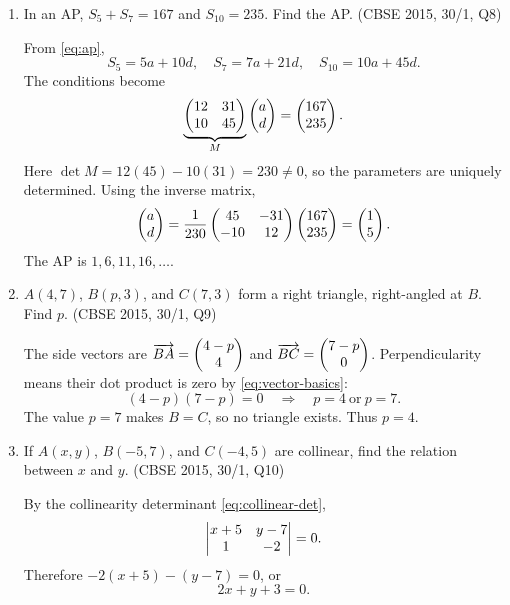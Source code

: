 \begin{enumerate}[label=\textbf{Q\arabic*.},ref=\arabic*,start=5]
\solution Rearranging and using \eqref{eq:difference-squares},
\[
(2x+b)^2-a^2=0\quad\Longrightarrow\quad (2x+b-a)(2x+b+a)=0.
\]
Thus $2x+b=\pm a$, giving
\[
\boxed{x=\frac{-b+a}{2}\quad\text{or}\quad x=\frac{-b-a}{2}}.
\]

\item In an AP, $S_5+S_7=167$ and $S_{10}=235$. Find the AP. \hfill (CBSE 2015, 30/1, Q8)

\solution From \eqref{eq:ap},
\[
S_5=5a+10d,\quad S_7=7a+21d,\quad S_{10}=10a+45d.
\]
The conditions become
\[
\underbrace{\begin{pmatrix}12&31\\10&45\end{pmatrix}}_{M}\begin{pmatrix}a\\d\end{pmatrix}=\begin{pmatrix}167\\235\end{pmatrix}.
\]
Here $\det M=12(45)-10(31)=230\ne0$, so the parameters are uniquely determined. Using the inverse matrix,
\[
\begin{pmatrix}a\\d\end{pmatrix}=\frac1{230}\begin{pmatrix}45&-31\\-10&12\end{pmatrix}\begin{pmatrix}167\\235\end{pmatrix}=\begin{pmatrix}1\\5\end{pmatrix}.
\]
The AP is $\boxed{1,6,11,16,\ldots}$.

\item $A(4,7)$, $B(p,3)$, and $C(7,3)$ form a right triangle, right-angled at $B$. Find $p$. \hfill (CBSE 2015, 30/1, Q9)

\solution The side vectors are $\overrightarrow{BA}=\begin{pmatrix}4-p\\4\end{pmatrix}$ and $\overrightarrow{BC}=\begin{pmatrix}7-p\\0\end{pmatrix}$. Perpendicularity means their dot product is zero by \eqref{eq:vector-basics}:
\[
(4-p)(7-p)=0\quad\Longrightarrow\quad p=4\ \text{or}\ p=7.
\]
The value $p=7$ makes $B=C$, so no triangle exists. Thus $\boxed{p=4}$.

\item If $A(x,y)$, $B(-5,7)$, and $C(-4,5)$ are collinear, find the relation between $x$ and $y$. \hfill (CBSE 2015, 30/1, Q10)

\solution By the collinearity determinant \eqref{eq:collinear-det},
\[
\begin{vmatrix}x+5&y-7\\1&-2\end{vmatrix}=0.
\]
Therefore $-2(x+5)-(y-7)=0$, or
\[
\boxed{2x+y+3=0}.
\]
\end{enumerate}

